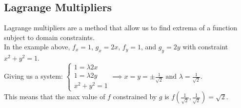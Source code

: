 \subsection{Lagrange Multipliers}
\noindent
Lagrange multipliers are a method that allow us to find extrema of a function subject to domain constraints.\\



\noindent
In the example above, $f_x=1$, $g_x=2x$, $f_y=1$, and $g_y=2y$ with constraint $x^2+y^2=1$.\\ 
Giving us a system: $\begin{cases}1=\lambda 2x \\ 1=\lambda 2y \\ x^2+y^2=1\end{cases}\implies x=y=\pm\frac{1}{\sqrt{2}}\text{ and }\lambda=\frac{1}{\sqrt{2}}$.\\
This means that the max value of $f$ constrained by $g$ is $f\left(\frac{1}{\sqrt{2}},\frac{1}{\sqrt{2}}\right)=\sqrt{2}$.

